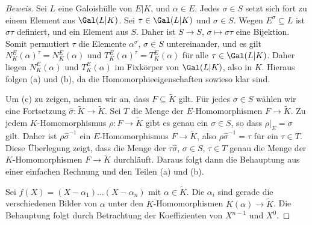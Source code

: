\documentclass[12pt,a4paper,twoside]{article}
\begin{document}
\begin{proof}[Beweis]
  Sei $L$ eine Galoish\"ulle von $E|K$, und $\alpha\in E$. Jedes $\sigma\in S$
  setzt sich fort zu einem Element aus $\Gal(L|K)$. Sei $\tau\in\Gal(L|K)$ und
  $\sigma\in S$. Wegen $E^\sigma\subseteq L$ ist $\sigma\tau$ definiert, und
  ein Element aus $S$. Daher ist $S\to S$, $\sigma\mapsto\sigma\tau$ eine
  Bijektion. Somit permutiert $\tau$ die Elemente $\alpha^\sigma$, $\sigma\in
  S$ untereinander, und es gilt $N_K^E(\alpha)^\tau=N_K^E(\alpha)$ und
  $T_K^E(\alpha)^\tau=T_K^E(\alpha)$ f\"ur alle $\tau\in\Gal(L|K)$. Daher
  liegen $N_K^E(\alpha)$ und $T_K^E(\alpha)$ im Fixk\"orper von $\Gal(L|K)$,
  also in $K$. Hieraus folgen (a) und (b), da die Homomorphieeigenschaften
  sowieso klar sind.
  
  Um (c) zu zeigen, nehmen wir an, dass $F\subseteq\tilde K$ gilt. F\"ur jedes
  $\sigma\in S$ w\"ahlen wir eine Fortsetzung $\hat\sigma:\tilde K\to\tilde
  K$. Sei $T$ die Menge der $E$-Homomorphismen $F\to\tilde K$. Zu jedem
  $K$-Homomorphismus $\rho:F\to\tilde K$ gibt es genau ein $\sigma\in S$, so
  dass $\rho|_E=\sigma$ gilt. Daher ist $\rho\hat\sigma^{-1}$ ein
  $E$-Homomorphismus $F\to\tilde K$, also $\rho\hat\sigma^{-1}=\tau$ f\"ur ein
  $\tau\in T$. Diese \"Uberlegung zeigt, dass die Menge der $\tau\hat\sigma$,
  $\sigma\in S$, $\tau\in T$ genau die Menge der $K$-Homomorphismen
  $F\to\tilde K$ durchl\"auft. Daraus folgt dann die Behauptung aus einer
  einfachen Rechnung und den Teilen (a) und (b).
  
  Sei $f(X)=(X-\alpha_1)\dots(X-\alpha_n)$ mit $\alpha\in\tilde K$. Die
  $\alpha_i$ sind gerade die verschiedenen Bilder von $\alpha$ unter den
  $K$-Homomorphismen $K(\alpha)\to\tilde K$. Die Behauptung folgt durch
  Betrachtung der Koeffizienten von $X^{n-1}$ und $X^0$.
\end{proof}
\end{document}
